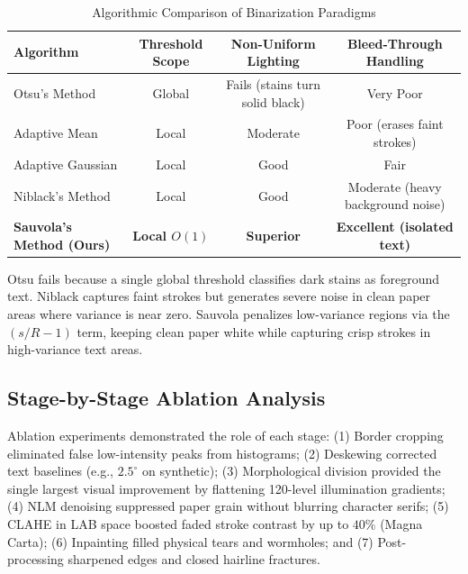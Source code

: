 \documentclass[11pt, a4paper]{article}
\begin{document}
\begin{table}[htbp]
\centering
\small
\caption{Algorithmic Comparison of Binarization Paradigms}
\vspace{0.4em}
\begin{tabular}{lccc}
\toprule
\textbf{Algorithm} & \textbf{Threshold Scope} & \textbf{Non-Uniform Lighting} & \textbf{Bleed-Through Handling} \\
\midrule
Otsu's Method \cite{otsu1979}       & Global                & Fails (stains turn solid black)  & Very Poor \\
Adaptive Mean                       & Local                 & Moderate                         & Poor (erases faint strokes) \\
Adaptive Gaussian                   & Local                 & Good                             & Fair \\
Niblack's Method \cite{niblack1986} & Local                 & Good                             & Moderate (heavy background noise) \\
\textbf{Sauvola's Method (Ours)} \cite{sauvola2000} & \textbf{Local $O(1)$} & \textbf{Superior} & \textbf{Excellent (isolated text)} \\
\bottomrule
\end{tabular}
\label{tab:binarization}
\end{table}

Otsu fails because a single global threshold classifies dark stains as foreground text. Niblack captures faint strokes but generates severe noise in clean paper areas where variance is near zero. Sauvola penalizes low-variance regions via the $(s/R - 1)$ term, keeping clean paper white while capturing crisp strokes in high-variance text areas.

\subsection{Stage-by-Stage Ablation Analysis}
Ablation experiments demonstrated the role of each stage: (1) Border cropping eliminated false low-intensity peaks from histograms; (2) Deskewing corrected text baselines (e.g., $2.5^\circ$ on synthetic); (3) Morphological division provided the single largest visual improvement by flattening 120-level illumination gradients; (4) NLM denoising suppressed paper grain without blurring character serifs; (5) CLAHE in LAB space boosted faded stroke contrast by up to $40\%$ (Magna Carta); (6) Inpainting filled physical tears and wormholes; and (7) Post-processing sharpened edges and closed hairline fractures.
\end{document}
